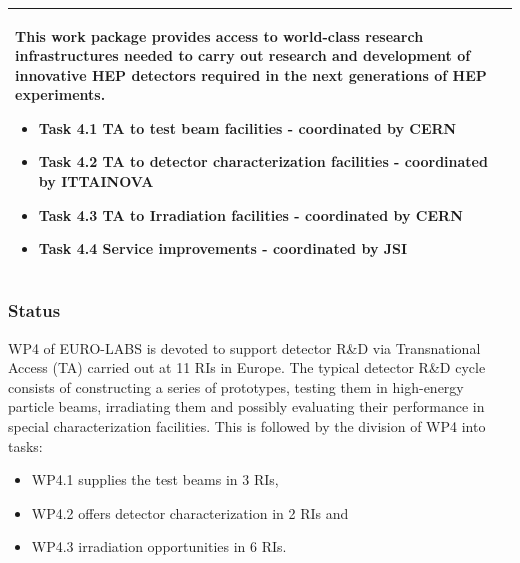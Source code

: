 \begin{table}[H]
\begin{tabular}{|p{}|}
        \rowcolor{white} 
        \hspace*{-0.75cm} 
        \begin{minipage}[t]{\textwidth}
        {\leftskip=15pt
        This work package provides access to world-class research infrastructures needed to carry out research and development of innovative HEP detectors required in the next generations of HEP experiments.
    		\begin{itemize}
    		    \item Task 4.1 TA to test beam facilities - coordinated by CERN
    			\item Task 4.2 TA to detector characterization facilities - coordinated by ITTAINOVA
			    \item Task 4.3 TA to Irradiation facilities - coordinated by CERN
                    \item Task 4.4 Service improvements - coordinated by JSI
    		\end{itemize} 
    		\vspace*{0.10em}
        }
	\end{minipage}        
        \\
        \hline
    \end{tabular}
    \vspace{0.5em}\vfill
\end{table}
\subsubsection*{Status}
WP4 of EURO-LABS is devoted to support detector R\&D via Transnational Access (TA) carried out at 11 RIs in Europe. The typical detector R\&D cycle consists of constructing a series of prototypes, testing them in high-energy particle beams, irradiating them and possibly evaluating their performance in special characterization facilities. This is followed by the division of WP4 into tasks: 
\begin{itemize}
    \item WP4.1 supplies the test beams in 3 RIs, 
    \item WP4.2 offers detector characterization in 2 RIs and
    \item WP4.3 irradiation opportunities in 6 RIs.
\end{itemize}


